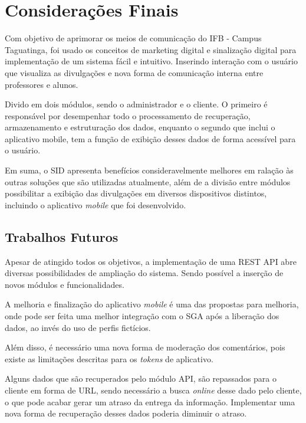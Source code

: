 \chapter[Considerações Finais]{Considerações Finais}
Com objetivo de aprimorar os meios de comunicação do IFB - Campus Taguatinga, foi usado os conceitos de marketing digital e sinalização digital para implementação de um sistema fácil e intuitivo. Inserindo interação com o usuário que visualiza as divulgações e nova forma de comunicação interna entre professores e alunos.  

Divido em dois módulos, sendo o administrador e o cliente. O primeiro é responsável por desempenhar todo o processamento de recuperação, armazenamento e estruturação dos dados, enquanto o segundo que inclui o aplicativo mobile, tem a função de exibição desses dados de forma acessível para o usuário.  

Em suma, o SID apresenta benefícios consideravelmente melhores em ralação às outras soluções que são utilizadas atualmente, além de a divisão entre módulos possibilitar a exibição das divulgações em diversos dispositivos distintos, incluindo o aplicativo \textit{mobile} que foi desenvolvido.

\section{Trabalhos Futuros}
Apesar de atingido todos os objetivos, a implementação de uma REST API abre diversas possibilidades de ampliação do sistema. Sendo possível a inserção de novos módulos e funcionalidades.

A melhoria e finalização do aplicativo \textit{mobile} é uma das propostas para melhoria, onde pode ser feita uma melhor integração com o SGA após a liberação dos dados, ao invés do uso de perfis fictícios.

Além disso, é necessário uma nova forma de moderação dos comentários, pois existe as limitações descritas para os \textit{tokens} de aplicativo.

Alguns dados que são recuperados pelo módulo API, são repassados para o cliente em forma de URL, sendo necessário a busca \textit{online} desse dado pelo cliente, o que pode acabar gerar um atraso da entrega da informação. Implementar uma nova forma de recuperação desses dados poderia diminuir o atraso. 